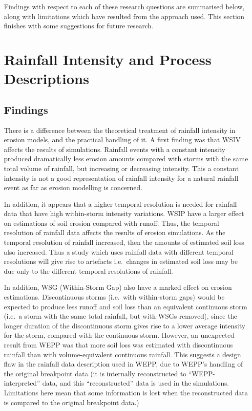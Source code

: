 Findings with respect to each of these research questions are summarised below,
along with limitations which have resulted from the approach used. This section
finishes with some suggestions for future research.

\section{Rainfall Intensity and Process Descriptions}
\label{sec:RainfallIntensityAndProcessDescriptions}
\subsection{Findings}
\label{sec:FindingsStage1}

There is a difference between the theoretical treatment of rainfall
intensity in erosion models, and the practical handling of it.
A first finding was that WSIV affects the results of simulations. Rainfall
events with a constant intensity produced dramatically less erosion amounts
compared with storms with the same total volume of rainfall, but increasing or
decreasing intensity. This a constant intensity is not a good representation of
rainfall intensity for a natural rainfall event as far as erosion modelling is
concerned.

In addition, it appears that a higher temporal resolution is needed for rainfall
data that have high within-storm intensity variations. WSIP have a larger effect
on estimations of soil erosion compared with runoff. Thus, the temporal
resolution of rainfall data affects the results of erosion simulations. As the
temporal resolution of rainfall increased, then the amounts of estimated soil
loss also increased. Thus a study which uses rainfall data with different
temporal resolutions will give rise to artefacts i.e.\ changes in estimated soil
loss may be due only to the different temporal resolutions of rainfall.

In addition, WSG (Within-Storm Gap) also have a marked effect on erosion
estimations. Discontinuous storms (i.e.\ with within-storm gaps) would be
expected to produce less runoff and soil loss than an equivalent continuous
storm (i.e.\ a storm with the same total rainfall, but with WSGs removed), since
the longer duration of the discontinuous storm gives rise to a lower average
intensity for the storm, compared with the continuous storm.
However, an unexpected result from WEPP was that more soil loss was estimated
with discontinuous rainfall than with volume-equivalent continuous rainfall.
This suggests a design flaw in the rainfall data description used in WEPP, due
to WEPP's handling of the  original breakpoint data (it is internally
reconstructed to ``WEPP-interpreted'' data, and this ``reconstructed'' data is
used in the simulations. Limitations here mean that some information is lost
when the reconstructed data is compared to the original breakpoint data.)


